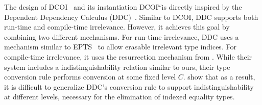 \documentclass[acmsmall]{acmart}
\makeatletter
\theoremstyle{linked}
\theoremstyle{deflinked}
\theoremstyle{acmdefinition}
\newcommand{\dcoi}{DCOI\@\xspace}
\newcommand{\name}{\texorpdfstring{DCOI$^{\omega}$\@\xspace}{DCOI-omega}}
\makeatother
\begin{document}
The design of \dcoi~\citep{liu:dcoi} and its instantiation \name is
directly inspired by the Dependent Dependency Calculus
(DDC)~\citep{choudhury:ddc}. Similar to \dcoi,
DDC supports both run-time and compile-time irrelevance. However, it achieves
this goal by combining two different mechanisms.
For run-time irrelevance, DDC uses a mechanism similar to
EPTS~\citep{mishra:erasure} to allow erasable irrelevant type indices.
For compile-time irrelevance, it uses the resurrection mechanism from
\citet{pfenning:modal, abel:irrelevance}.
While their system includes a indistinguishability relation
similar to ours, their type
conversion rule performs conversion at some fixed level
$C$. \citet{liu:dcoi} show that as a result,
it is difficult to generalize DDC's conversion rule to support
indistinguishability at different levels, necessary for
the elimination of indexed equality types.


\end{document}
